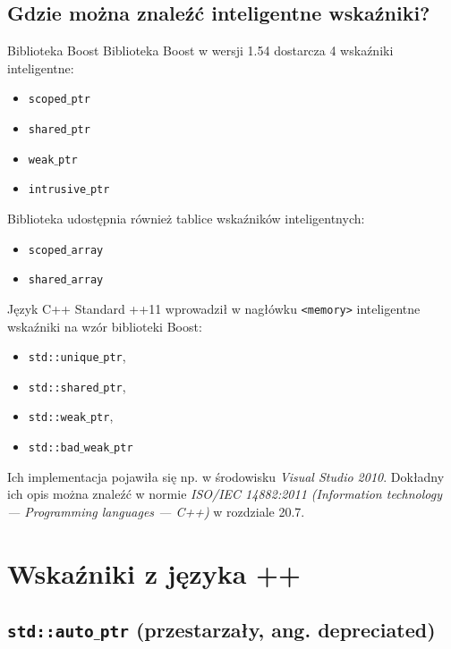 \subsection{Gdzie można znaleźć inteligentne wskaźniki?}
\begin{frame}{Biblioteka Boost}
  Biblioteka Boost w wersji 1.54 dostarcza 4 wskaźniki inteligentne:\pause
  \begin{itemize}
  	\item \texttt{scoped$\_$ptr}    \pause
  	\item \texttt{shared$\_$ptr}    \pause
  	\item \texttt{weak$\_$ptr}      \pause
  	\item \texttt{intrusive$\_$ptr} 
  \end{itemize}
  \pause
  Biblioteka udostępnia również tablice wskaźników inteligentnych:\pause
  \begin{itemize}
  \item	\texttt{scoped$\_$array} \pause
  \item	\texttt{shared$\_$array} 
  \end{itemize}
\end{frame}

\begin{frame}{Język  C++}
  Standard \C++11 wprowadził w nagłówku \texttt{<memory>}
  inteligentne wskaźniki na wzór biblioteki Boost: 
  \begin{itemize}
    \pause
  \item \texttt{std::unique$\_$ptr}, 
    \pause
  \item \texttt{std::shared$\_$ptr},
    \pause
  \item \texttt{std::weak$\_$ptr},
    \pause
  \item \texttt{std::bad$\_$weak$\_$ptr}
  \end{itemize}\pause
  Ich implementacja pojawiła się np. w środowisku 
  \textit{Visual Studio 2010}.	\pause
  Dokładny ich opis można znaleźć w normie
  \textit{ISO/IEC 14882:2011 (Information technology — Programming
    languages --- C++)} w rozdziale 20.7. 
\end{frame}


\section{Wskaźniki z języka \C++}

\subsection{\texttt{std::auto$\_$ptr} \tiny{(przestarzały, ang. depreciated)}}

